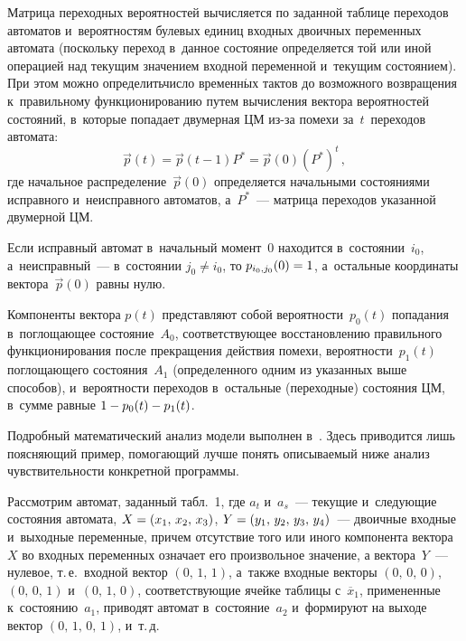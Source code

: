 \begin{multicols}{2}
     Матрица переходных вероятностей вычисляется по заданной таблице 
переходов автоматов и~вероятностям булевых единиц входных двоичных 
переменных автомата (поскольку переход в~данное состояние определяется той 
или иной операцией над текущим значением входной переменной и~текущим 
состоянием). При этом можно определить\linebreak чис\-ло временн$\acute{\mbox{ы}}$х тактов до 
возможного возвращения к~правильному функционированию путем\linebreak 
вы\-чис\-ле\-ния вектора вероятностей состояний, в~которые попадает двумерная 
ЦМ из-за помехи за~$t$~переходов автомата: 
     \begin{equation}
     \vec{p}(t) =\vec{p}(t-1)P^*=\vec{p}(0)\left( P^*\right)^t\,,
     \label{e1-fr}
     \end{equation}
где начальное распределение~$\vec{p}(0)$ определяется начальными 
состояниями исправного и~неисправного автоматов, а~$P^*$~--- матрица 
переходов указанной двумерной ЦМ.

     Если исправный автомат в~начальный момент~0 находится 
в~состоянии~$i_0$, а~неисправный~--- в~состоянии $j_0\not= i_0$, то 
$p_{i_0,j_0}(0)\hm=1$, а~остальные координаты вектора~$\vec{p}(0)$ равны 
нулю.
     
     Компоненты вектора $p(t)$ представляют собой вероятности~$p_0(t)$ 
попадания в~поглощающее состояние~$A_0$, соответствующее 
восстановлению правильного функционирования после прекращения действия 
помехи, вероятности~$p_1(t)$ поглощающего состояния~$A_1$ 
(определенного одним из указанных выше способов), и~вероятности переходов в~остальные (переходные) состояния ЦМ, в~сумме равные $1\hm- p_0(t)\hm- 
p_1(t)$.
     
     Подробный математический анализ модели выполнен в~\cite{3-fr}. Здесь 
приводится лишь по\-ясня\-ющий пример, помогающий лучше понять 
описываемый ниже анализ чувствительности конкретной программы.


     
     Рассмотрим автомат, заданный табл.~1, где $a_t$ и~$a_s$~--- текущие 
и~следующие состояния автомата, $X\hm=(x_1,\,x_2,\,x_3)$, 
$Y\hm=(y_1,\,y_2,\,y_3,\,y_4)$~--- двоичные входные и~выходные переменные, 
причем отсутствие того или иного компонента вектора~$X$ во входных 
переменных означает его произвольное значение, а вектора~$Y$~--- нулевое, 
т.\,е.\ входной вектор $(0,\,1,\,1)$, а~также входные векторы $(0,\,0,\,0)$, 
$(0,\,0,\,1)$ и~$(0,\,1,\,0)$, соответствующие ячейке таблицы с~$\overline{x}_1$, 
примененные к~состоянию~$a_1$, приводят автомат в~состояние~$a_2$ 
и~формируют на выходе вектор $(0,\,1,\,0,\,1)$, и~т.\,д.


\end{multicols}
